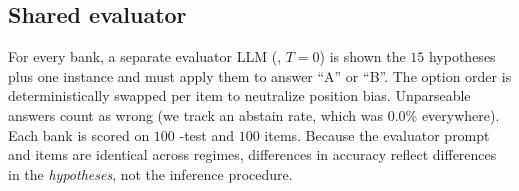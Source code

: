 \begin{table}[t]
\centering
\caption{The six ideation regimes: one ungrounded control plus five grounding
mechanisms. Each generates a bank of $K{=}15$ task hypotheses under \gptmini.
Generation tokens per bank (rightmost) span nearly two orders of magnitude.}
\label{tab:regimes}
\end{table}

\subsection{Shared evaluator}
\label{sec:eval}

For every bank, a separate evaluator LLM (\gptmini, $T{=}0$) is shown the $15$
hypotheses plus one instance and must apply them to answer ``A'' or ``B''. The option
order is deterministically swapped per item to neutralize position bias. Unparseable
answers count as wrong (we track an abstain rate, which was $0.0\%$ everywhere). Each
bank is scored on $100$ \IND{}-test and $100$ \OOD{} items. Because the evaluator
prompt and items are identical across regimes, differences in accuracy reflect
differences in the \emph{hypotheses}, not the inference procedure.

